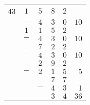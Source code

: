 \documentclass{standalone}
\begin{document}
\begin{tabular}{rcccc|r} \cline{2-5}
	43 & \multicolumn{1}{|c}{$1$} & $5$ & $8$ & \multicolumn{1}{c}{$2$} &  \\
	& $-$ & $4$ & $3$ & $0$ & $10$ \\ \cline{2-5}
	& $1$ & $1$ & $5$ & \multicolumn{1}{c}{$2$}  & \\
	& $-$ & $4$ & $3$ & $0$ & $10$ \\ \cline{2-5}
	&   & $7$ & $2$ & \multicolumn{1}{c}{$2$}  & \\
	& $-$ & $4$ & $3$ & $0$ & $10$ \\ \cline{2-5}
	&   & $2$ & $9$ & \multicolumn{1}{c}{$2$}  & \\
	& $-$ & $2$ & $1$ & $5$ & $5$ \\ \cline{2-5}
	&   &  & $7$ & \multicolumn{1}{c}{$7$} & \\
	& & $-$ & $4$ & $3$ & $1$ \\ \cline{3-6}
	& & & $3$ & $4$ & $36$
\end{tabular}
\end{document}
